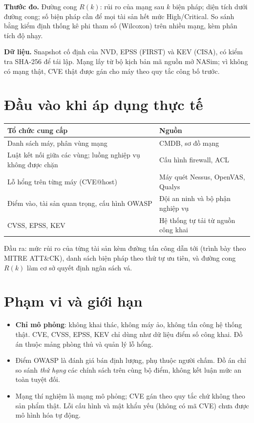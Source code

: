 \documentclass[11pt,a4paper]{article}
\begin{document}
\textbf{Thước đo.} Đường cong $R(k)$: rủi ro của mạng sau $k$ biện pháp; diện tích dưới đường cong; số biện pháp cần để mọi tài sản hết mức High/Critical. So sánh bằng kiểm định thống kê phi tham số (Wilcoxon) trên nhiều mạng, kèm phân tích độ nhạy.

\textbf{Dữ liệu.} Snapshot cố định của NVD, EPSS (FIRST) và KEV (CISA), có kiểm tra SHA-256 để tái lập. Mạng lấy từ bộ kịch bản mã nguồn mở NASim; vì không có mạng thật, CVE thật được gán cho máy theo quy tắc công bố trước.

\section{Đầu vào khi áp dụng thực tế}

\begin{center}
\small
\begin{tabular}{@{}Y{6.4cm}Y{8.6cm}@{}}
\toprule
\textbf{Tổ chức cung cấp} & \textbf{Nguồn} \\
\midrule
Danh sách máy, phân vùng mạng & CMDB, sơ đồ mạng \\
Luật kết nối giữa các vùng; luồng nghiệp vụ không được chặn & Cấu hình firewall, ACL \\
Lỗ hổng trên từng máy (CVE@host) & Máy quét Nessus, OpenVAS, Qualys \\
Điểm vào, tài sản quan trọng, cấu hình OWASP & Đội an ninh và bộ phận nghiệp vụ \\
\midrule
CVSS, EPSS, KEV & Hệ thống tự tải từ nguồn công khai \\
\bottomrule
\end{tabular}
\end{center}

Đầu ra: mức rủi ro của từng tài sản kèm đường tấn công dẫn tới (trình bày theo MITRE ATT\&CK), danh sách biện pháp theo thứ tự ưu tiên, và đường cong $R(k)$ làm cơ sở quyết định ngân sách vá.

\section{Phạm vi và giới hạn}

\begin{itemize}
  \item \textbf{Chỉ mô phỏng}: không khai thác, không máy ảo, không tấn công hệ thống thật. CVE, CVSS, EPSS, KEV chỉ dùng như dữ liệu điểm số công khai. Đồ án thuộc mảng phòng thủ và quản lý lỗ hổng.
  \item Điểm OWASP là đánh giá bán định lượng, phụ thuộc người chấm. Đồ án chỉ so sánh \emph{thứ hạng} các chính sách trên cùng bộ điểm, không kết luận mức an toàn tuyệt đối.
  \item Mạng thí nghiệm là mạng mô phỏng; CVE gán theo quy tắc chứ không theo sản phẩm thật. Lỗi cấu hình và mật khẩu yếu (không có mã CVE) chưa được mô hình hóa tự động.
\end{itemize}
\end{document}
